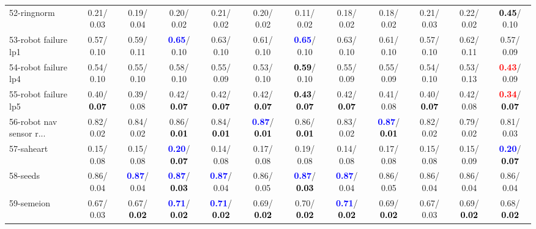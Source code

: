 \begin{table}[h]
\begin{center}
{\begin{tabular}{lc|c|c|c|c|c|c|c|c|c|c}
52-ringnorm &   0.21/  0.03 &   0.19/  0.04 &   0.20/  0.02 &   0.21/  0.02 &   0.20/  0.02 &   0.11/  0.02 &   0.18/  0.02 &   0.18/  0.02 &   0.21/  0.03 &   0.22/  0.02 & \textcolor{black}{\textbf{  0.45}}/  0.10 \\
53-robot failure lp1 &   0.57/  0.10 &   0.59/  0.11 & \textcolor{blue}{\textbf{  0.65}}/  0.10 &   0.63/  0.10 &   0.61/  0.10 & \textcolor{blue}{\textbf{  0.65}}/  0.10 &   0.63/  0.10 &   0.61/  0.10 &   0.57/  0.10 &   0.62/  0.11 &   0.57/  0.09 \\ \hline
54-robot failure lp4 &   0.54/  0.10 &   0.55/  0.10 &   0.58/  0.10 &   0.55/  0.09 &   0.53/  0.10 & \textcolor{black}{\textbf{  0.59}}/  0.10 &   0.55/  0.09 &   0.55/  0.09 &   0.54/  0.10 &   0.53/  0.13 & \textcolor{red}{\textbf{  0.43}}/  0.09 \\
55-robot failure lp5 &   0.40/\textcolor{black}{\textbf{  0.07}} &   0.39/  0.08 &   0.42/\textcolor{black}{\textbf{  0.07}} &   0.42/\textcolor{black}{\textbf{  0.07}} &   0.42/\textcolor{black}{\textbf{  0.07}} & \textcolor{black}{\textbf{  0.43}}/\textcolor{black}{\textbf{  0.07}} &   0.42/\textcolor{black}{\textbf{  0.07}} &   0.41/  0.08 &   0.40/\textcolor{black}{\textbf{  0.07}} &   0.42/  0.08 & \textcolor{red}{\textbf{  0.34}}/\textcolor{black}{\textbf{  0.07}} \\
56-robot nav sensor r... &   0.82/  0.02 &   0.84/  0.02 &   0.86/\textcolor{black}{\textbf{  0.01}} &   0.84/\textcolor{black}{\textbf{  0.01}} & \textcolor{blue}{\textbf{  0.87}}/\textcolor{black}{\textbf{  0.01}} &   0.86/\textcolor{black}{\textbf{  0.01}} &   0.83/  0.02 & \textcolor{blue}{\textbf{  0.87}}/\textcolor{black}{\textbf{  0.01}} &   0.82/  0.02 &   0.79/  0.02 &   0.81/  0.03 \\
57-saheart &   0.15/  0.08 &   0.15/  0.08 & \textcolor{blue}{\textbf{  0.20}}/\textcolor{black}{\textbf{  0.07}} &   0.14/  0.08 &   0.17/  0.08 &   0.19/  0.08 &   0.14/  0.08 &   0.17/  0.08 &   0.15/  0.08 &   0.15/  0.09 & \textcolor{blue}{\textbf{  0.20}}/\textcolor{black}{\textbf{  0.07}} \\
58-seeds &   0.86/  0.04 & \textcolor{blue}{\textbf{  0.87}}/  0.04 & \textcolor{blue}{\textbf{  0.87}}/\textcolor{black}{\textbf{  0.03}} & \textcolor{blue}{\textbf{  0.87}}/  0.04 &   0.86/  0.05 & \textcolor{blue}{\textbf{  0.87}}/\textcolor{black}{\textbf{  0.03}} & \textcolor{blue}{\textbf{  0.87}}/  0.04 &   0.86/  0.05 &   0.86/  0.04 &   0.86/  0.04 &   0.86/  0.04 \\
59-semeion &   0.67/  0.03 &   0.67/\textcolor{black}{\textbf{  0.02}} & \textcolor{blue}{\textbf{  0.71}}/\textcolor{black}{\textbf{  0.02}} & \textcolor{blue}{\textbf{  0.71}}/\textcolor{black}{\textbf{  0.02}} &   0.69/\textcolor{black}{\textbf{  0.02}} &   0.70/\textcolor{black}{\textbf{  0.02}} & \textcolor{blue}{\textbf{  0.71}}/\textcolor{black}{\textbf{  0.02}} &   0.69/\textcolor{black}{\textbf{  0.02}} &   0.67/  0.03 &   0.69/\textcolor{black}{\textbf{  0.02}} &   0.68/\textcolor{black}{\textbf{  0.02}} \\

\end{tabular}}
\end{center}
\end{table}
